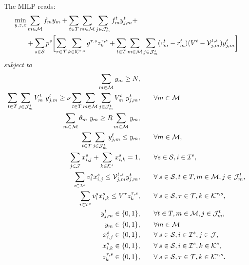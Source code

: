 \documentclass[a4paper,11pt]{article}
\begin{document}
	The MILP reads:
	\begin{equation}
		\begin{split}
			\min_{y,z,x} & \sum_{m \in \cal M} {f_{m}}y_{m} +  \sum_{t \in T} \sum_{m \in {{\cal M}}} \sum_{j \in {\cal J}_{m}^t} f_{m}^t y_{j,m}^t + \\
			& + \sum_{s \in \cal S} p^{s} \biggl [ \sum_{\tau \in \cal T} \sum_{k \in {\cal K}^{\tau,s}} g^{\tau,s} z_k^{\tau,s} + \sum_{t \in T} \sum_{m \in {\cal M}} \sum_{j \in {\cal J}^t_{m}} (c_{m}^t-r_{m}^t)(V^{t} - {\cal V}_{j,m}^{t,s}) y_{j,m}^t \biggr] \label{eq:dep:obj}
		\end{split}
	\end{equation}
	\textit{subject to}
	\begin{alignat}{2}
		\sum\limits_{m \in \cal {M}} y_{m}\geq{N}, & \qquad
		\label{eq:dep:3}\\
		\sum\limits_{t \in T} \sum\limits_{j \in {\cal J}^t_{m}} V_{m}^{t} \ y_{j,m}^{t} \geq \nu \sum\limits_{t \in T} \sum\limits_{m \in {\cal M}} \sum\limits_{j \in {\cal J}^t_{m}} V_{m}^{t} \ y^t_{j,m}, & \qquad \forall m \in {\cal M}
		\label{eq:dep:3.2}\\
		\sum\limits_{m \in {\cal M}} \theta_{m} \ y_{m} \geq R \sum\limits_{m \in {\cal M}} y_{m}, & \qquad \label{eq:dep:4}\\
		\sum\limits_{t \in T} \sum\limits_{j \in {\cal J}^t_{m}} y_{j,m}^{t} \leq y_{m}, & \qquad \forall m \in \cal M, \label{eq:dep:5}\\
		\sum\limits_{j \in \cal J}x_{i,j}^{s} + \sum\limits_{k \in {\cal K}^{s}}x_{i,k}^{s} = 1, & \qquad \forall s \in {\cal S}, i \in {\cal I}^{s}, \label{eq:dep:9}\\
		\sum\limits_{i \in {\cal I}^{s}}v_i^{s} x_{i,j}^{s} \leq {\cal V}_{j,m}^{t,s} y_{j,m}^t, & \qquad \forall \: s \in {\cal S}, t \in T, m\in{{\cal M}}, j \in {\cal J}^t_{m}, \label{eq:dep:10}\\
		\sum\limits_{i \in {\cal I}^{s}} v_i^{s} x_{i,k}^{s} \leq V^{\tau} z_k^{\tau,s}, & \qquad \forall \: s \in {\cal S}, \tau \in {\cal T}, k \in {\cal K}^{\tau,s}, \label{eq:dep:11}\\
		y_{j,m}^t \in \{0, 1\}, & \qquad \forall t \in T, m \in {\cal M}, j \in {\cal J}^t_{m}, \label{eq:dep:6}\\
		y_{m} \in \{0, 1\}, & \qquad \forall m \in \cal M \label{eq:dep:7}\\
		x_{i,j}^{s} \in \{0, 1\}, & \qquad \forall \: s \in {\cal S}, i \in {\cal I}^{s}, j \in {\cal J}, \label{eq:dep:12}\\
		x_{i,k}^{s} \in \{0, 1\}, & \qquad \forall \: s \in {\cal S}, i \in {\cal I}^{s}, k \in {\cal K}^{s}, \label{eq:dep:13}\\
		z_k^{\tau,s} \in \{0, 1\}, & \qquad \forall \: s \in {\cal S}, \tau \in {\cal T} , k \in {\cal K}^{\tau,s}. \label{eq:dep:14}
	\end{alignat}
\end{document}
